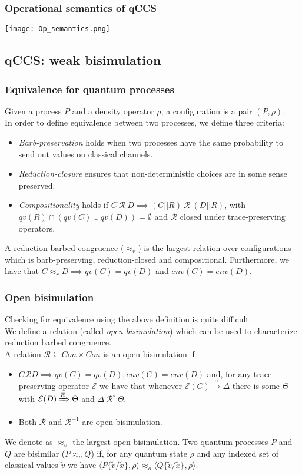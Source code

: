 \documentclass{beamer}
\begin{document}
\begin{frame}
\frametitle{Operational semantics of qCCS}
\center \texttt{[image: Op\_semantics.png]}
\end{frame}

\subsection{qCCS: weak bisimulation}

\begin{frame}
\frametitle{Equivalence for quantum processes}
Given a process $P$ and a density operator $\rho$, a configuration is a pair $(P, \rho)$. \\
In order to define equivalence between two processes, we define three criteria:
	\begin{itemize}
		\item \emph{Barb-preservation} holds when two processes have the same probability
		to send out values on classical channels.
		\item \emph{Reduction-closure} ensures that non-deterministic choices are in some
		sense preserved.
		\item \emph{Compositionality} holds if $C \ \mathcal{R} \ D \implies 
		(C \lvert \rvert R) \ \mathcal{R} \ (D \lvert \rvert R)$, with 
		$qv(R) \cap (qv(C) \cup qv(D)) = \emptyset$ and $\mathcal{R}$ closed under
		trace-preserving operators.
	\end{itemize}
A reduction barbed congruence ($\approx_r$) is the largest relation over configurations which is barb-preserving, reduction-closed and compositional. Furthermore, we have that $C \approx_r D \implies qv(C) = qv(D)$ and $env(C) = env(D)$.
\end{frame}

\begin{frame}
\frametitle{Open bisimulation}
Checking for equivalence using the above definition is quite difficult. \\
We define a relation (called \emph{open bisimulation}) which can be used to characterize reduction barbed congruence. \\
A relation $\mathcal{R} \subseteq Con \times Con$ is an open bisimulation if
	\begin{itemize}
		\item $C \mathcal{R} D \implies qv(C) = qv(D), env(C) = env(D)$ and, for any
		trace-preserving operator $\mathcal{E}$ we have that whenever $\mathcal{E}(C)
		\xrightarrow\alpha \Delta$ there is some $\Theta$ with $\mathcal{E}(D)
		\xRightarrow{\overline{\alpha}} \Theta$ and $\Delta \ \mathcal{R}^\circ \ \Theta$.
		\item Both $\mathcal{R}$ and $\mathcal{R}^{-1}$ are open bisimulation.
	\end{itemize}
We denote as $\approx_o$ the largest open bisimulation. Two quantum processes $P$ and $Q$ are bisimilar ($P \approx_o Q$) if, for any quantum state $\rho$ and any indexed set of classical values $\widetilde{v}$ we have 
$\langle P\{\widetilde{v} / \widetilde{x}\}, \rho \rangle \approx_o 
\langle Q\{\widetilde{v} / \widetilde{x}\}, \rho \rangle$.
\end{frame}
\end{document}
